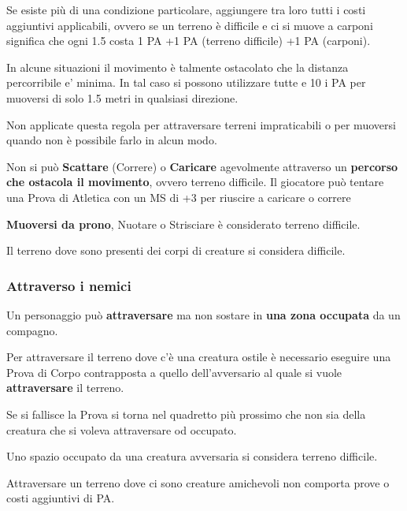\documentclass[12pt,a4paper,twoside,openany]{book}
\begin{document}
\begin{multicols}{2}
Se esiste più di una condizione particolare, aggiungere tra loro tutti i costi aggiuntivi applicabili, ovvero se un terreno è difficile e ci si muove a carponi significa che ogni 1.5 costa 1 PA +1 PA (terreno difficile) +1 PA (carponi).

In alcune situazioni il movimento è talmente ostacolato che la distanza percorribile e' minima. In tal caso si possono utilizzare tutte e 10 i PA per muoversi di solo 1.5 metri in qualsiasi direzione.

Non applicate questa regola per attraversare terreni impraticabili o per muoversi quando non è possibile farlo in alcun modo.

Non si può \textbf{Scattare} (Correre) o \textbf{Caricare}  agevolmente attraverso un \textbf{percorso che ostacola il movimento}, ovvero terreno difficile. Il giocatore può tentare una Prova di Atletica con un MS di +3 per riuscire a caricare o correre

\textbf{Muoversi da prono}, Nuotare o Strisciare è considerato terreno difficile.

Il terreno dove sono presenti dei corpi di creature si considera difficile.

\subsubsection{Attraverso i nemici}\label{attraversonemici}

Un personaggio può \textbf{attraversare} ma non sostare in \textbf{una zona occupata} da un compagno.

Per attraversare il terreno dove c'è una creatura ostile è necessario eseguire una Prova di Corpo contrapposta a quello dell'avversario al quale si vuole \textbf{attraversare} il terreno.

Se si fallisce la Prova si torna nel quadretto più prossimo che non sia della creatura che si voleva attraversare od occupato.

Uno spazio occupato da una creatura avversaria si considera terreno difficile.

Attraversare un terreno dove ci sono creature amichevoli non comporta prove o costi aggiuntivi di PA.



\end{multicols}
\end{document}
